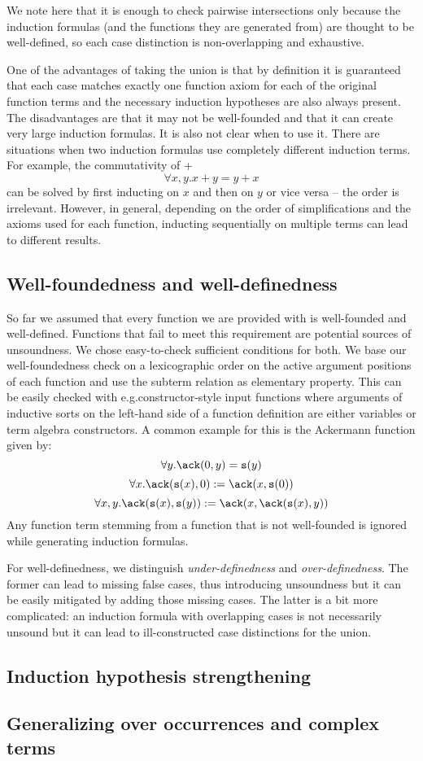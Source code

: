 We note here that it is enough to check pairwise intersections only because the induction formulas (and the functions they are generated from) are thought to be well-defined, so each case distinction is non-overlapping and exhaustive.

One of the advantages of taking the union is that by definition it is guaranteed that each case matches exactly one function axiom for each of the original function terms and the necessary induction hypotheses are also always present. The disadvantages are that it may not be well-founded and that it can create very large induction formulas. It is also not clear when to use it. There are situations when two induction formulas use completely different induction terms. For example, the commutativity of +
$$\forall x,y.x+y=y+x$$
can be solved by first inducting on $x$ and then on $y$ or vice versa -- the order is irrelevant. However, in general, depending on the order of simplifications and the axioms used for each function, inducting sequentially on multiple terms can lead to different results.

\subsection{Well-foundedness and well-definedness}
So far we assumed that every function we are provided with is well-founded and well-defined. Functions that fail to meet this requirement are potential sources of unsoundness. We chose easy-to-check sufficient conditions for both. We base our well-foundedness check on a lexicographic order on the active argument positions of each function and use the subterm relation as elementary property. This can be easily checked with e.g.constructor-style input functions where arguments of inductive sorts on the left-hand side of a function definition are either variables or term algebra constructors. A common example for this is the Ackermann function given by:
$$\forall y. \ack(0,y)=\suc(y)$$
$$\forall x.\ack(\suc(x),0):=\ack(x,\suc(0))$$
$$\forall x,y.\ack(\suc(x),\suc(y)):=\ack(x,\ack(\suc(x),y))$$
Any function term stemming from a function that is not well-founded is ignored while generating induction formulas.

For well-definedness, we distinguish \textit{under-definedness} and \textit{over-definedness}. The former can lead to missing false cases, thus introducing unsoundness but it can be easily mitigated by adding those missing cases. The latter is a bit more complicated: an induction formula with overlapping cases is not necessarily unsound but it can lead to ill-constructed case distinctions for the union. 


\subsection{Induction hypothesis strengthening}
\subsection{Generalizing over occurrences and complex terms}